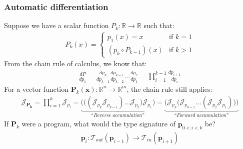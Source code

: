 \documentclass{beamer}
\begin{document}
    \begin{frame}
        \frametitle{Automatic differentiation}
        Suppose we have a scalar function $P_k: \mathbb{R}\rightarrow\mathbb{R}$ such that:
        \begin{align*}
            P_k(x) = \begin{cases} p_1(x) = x &\text{if } k=1\\ (p_k\circ P_{k-1})(x)&\text{if } k > 1 \end{cases}
        \end{align*}
        From the chain rule of calculus, we know that:
        \begin{align*}
            \frac{dP}{dp_1} = \frac{dp_k}{dp_{k-1}}\frac{dp_{k-1}}{dp_{k-2}}\dots\frac{dp_2}{dp_1}= {\displaystyle \prod_{i=1}^{k-1} \frac{dp_{i+1}}{dp_{i}}}
        \end{align*}
        For a vector function $\mathbf{P}_k(\mathbf{x}): \mathbb{R}^n\rightarrow\mathbb{R}^m$, the chain rule still applies:
        \begin{align*}
            \mathcal{J}_\mathbf{P_k} = \displaystyle \prod_{i=1}^{k} \mathcal{J}_{p_i} = \underbrace{\bigg(\Big((\mathcal{J}_{p_k} \mathcal{J}_{p_{k-1}}) \dots \mathcal{J}_{p_2}\Big) \mathcal{J}_{p_1}\bigg)}_{\textit{``Reverse accumulation''}} = \underbrace{\bigg(\mathcal{J}_{p_k} \Big(\mathcal{J}_{p_{k-1}} \dots (\mathcal{J}_{p_2} \mathcal{J}_{p_1})\Big)\bigg)}_{\textit{``Forward accumulation''}}
        \end{align*}
        If $\mathbf{P}_{k}$ were a program, what would the type signature of $\mathbf{p}_{0<i<k}$ be?
        \begin{align*}
            \mathbf{p}_i: \mathcal{T}_{out}(\mathbf{p}_{i-1}) \rightarrow \mathcal{T}_{in}(\mathbf{p}_{i+1})
        \end{align*}
    \end{frame}

\end{document}
